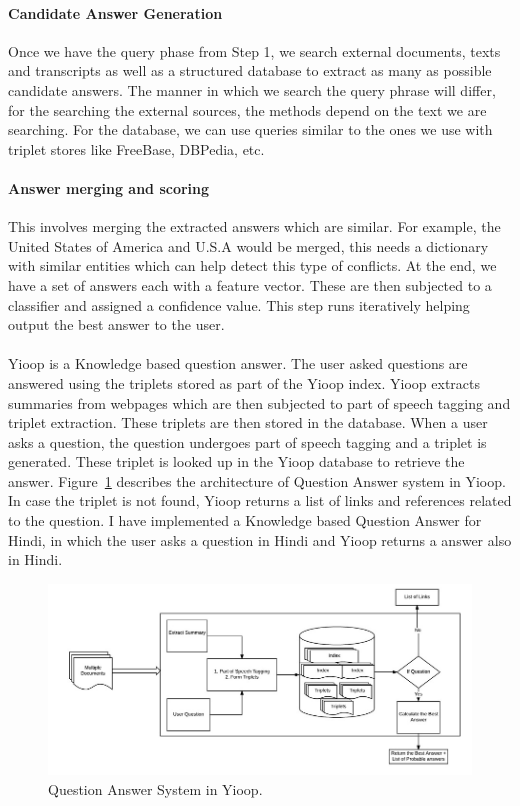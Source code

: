 \paragraph{Candidate Answer Generation}
Once we have the query phase from Step 1, we search external documents, texts and transcripts as well as a structured database to extract as many as possible candidate answers. The manner in which we search the query phrase will differ, for the searching the external sources, the methods depend on the text we are searching. For the database, we can use queries similar to the ones we use with triplet stores like FreeBase, DBPedia, etc.

\paragraph{Answer merging and scoring}
This involves merging the extracted answers which are similar. For example, the United States of America and U.S.A would be merged, this needs a dictionary with similar entities which can help detect this type of conflicts. At the end, we have a set of answers each with a feature vector. These are then subjected to a classifier and assigned a confidence value. This step runs iteratively helping output the best answer to the user.

 \break

 \paragraph{}
 Yioop is a Knowledge based question answer. The user asked questions are answered using the triplets stored as part of the Yioop index. Yioop extracts summaries from webpages which are then subjected to part of speech tagging and triplet extraction. These triplets are then stored in the database. When a user asks a question, the question undergoes part of speech tagging and a triplet is generated. These triplet is looked up in the Yioop database to retrieve the answer. Figure~\ref{fig:QA_Yioop}  describes the architecture of Question Answer system in Yioop. In case the triplet is not found, Yioop returns a list of links and references related to the question. I have implemented a Knowledge based Question Answer for Hindi, in which the user asks a question in Hindi and Yioop returns a answer also in Hindi.
 
 \begin{figure}[htb]
\centering
\includegraphics{images/QA_Yioop.jpg}
\caption{Question Answer System in Yioop.} 
\label{fig:QA_Yioop}
\end{figure}